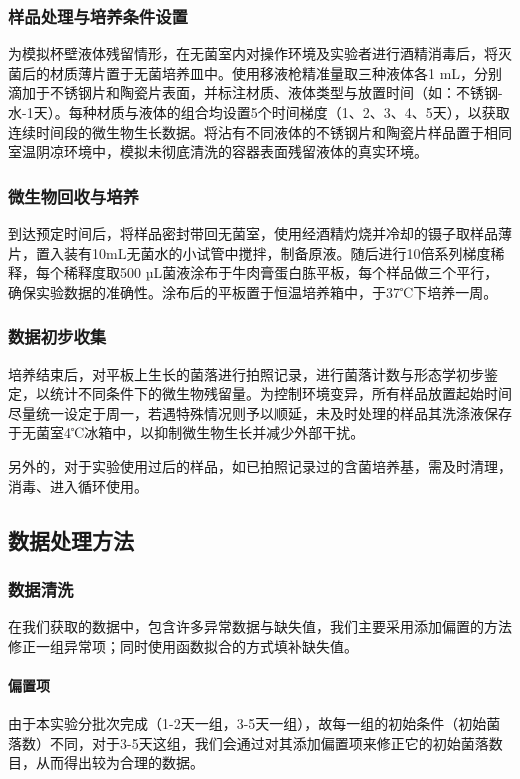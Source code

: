 \documentclass[12pt,a4paper]{ctexart}
\begin{document}
\subsubsection{样品处理与培养条件设置}

为模拟杯壁液体残留情形，在无菌室内对操作环境及实验者进行酒精消毒后，将灭菌后的材质薄片置于无菌培养皿中。使用移液枪精准量取三种液体各1 mL，分别滴加于不锈钢片和陶瓷片表面，并标注材质、液体类型与放置时间\cite{ZSTJ202405006}（如：不锈钢-水-1天）。每种材质与液体的组合均设置5个时间梯度（1、2、3、4、5天），以获取连续时间段的微生物生长数据。将沾有不同液体的不锈钢片和陶瓷片样品置于相同室温阴凉环境中，模拟未彻底清洗的容器表面残留液体的真实环境。

\subsubsection{微生物回收与培养}

到达预定时间后，将样品密封带回无菌室，使用经酒精灼烧并冷却的镊子取样品薄片，置入装有10mL无菌水的小试管中搅拌，制备原液。随后进行10倍系列梯度稀释，每个稀释度取500 µL菌液涂布于牛肉膏蛋白胨平板，每个样品做三个平行，确保实验数据的准确性。涂布后的平板置于恒温培养箱中，于37℃下培养一周。

\subsubsection{数据初步收集}

培养结束后，对平板上生长的菌落进行拍照记录，进行菌落计数与形态学初步鉴定，以统计不同条件下的微生物残留量。为控制环境变异，所有样品放置起始时间尽量统一设定于周一，若遇特殊情况则予以顺延，未及时处理的样品其洗涤液保存于无菌室4℃冰箱中，以抑制微生物生长并减少外部干扰。

另外的，对于实验使用过后的样品，如已拍照记录过的含菌培养基，需及时清理，消毒、进入循环使用。\cite{SPKX198605015}

\subsection{数据处理方法}

\subsubsection{数据清洗}
在我们获取的数据中，包含许多异常数据与缺失值，我们主要采用添加偏置的方法修正一组异常项；同时使用函数拟合的方式填补缺失值。
\paragraph{偏置项}
由于本实验分批次完成（1-2天一组，3-5天一组），故每一组的初始条件（初始菌落数）不同，对于3-5天这组，我们会通过对其添加偏置项来修正它的初始菌落数目，从而得出较为合理的数据。
\end{document}
